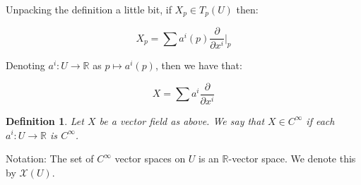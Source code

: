 \documentclass[10pt]{article}
\newtheorem{definition}{Definition}[section]
\begin{document}
Unpacking the definition a little bit, if $X_p \in T_p(U)$ then:

$$ X_p = \sum a^i(p) \frac{\partial}{\partial x^i} \bigg|_p$$

Denoting $a^i: U \to \mathbb{R}$ as $p \mapsto a^i(p)$, then we have that:

$$ X = \sum a^i \frac{\partial}{\partial x^i}$$

\begin{definition}
Let $X$ be a vector field as above. We say that $X \in C^\infty$ if each $a^i: U \to \mathbb{R}$ is $C^\infty$.
\end{definition}

Notation: The set of $C^\infty$ vector spaces on $U$ is an $\mathbb{R}$-vector space. We denote this by $\mathcal{X}(U)$.
\end{document}
